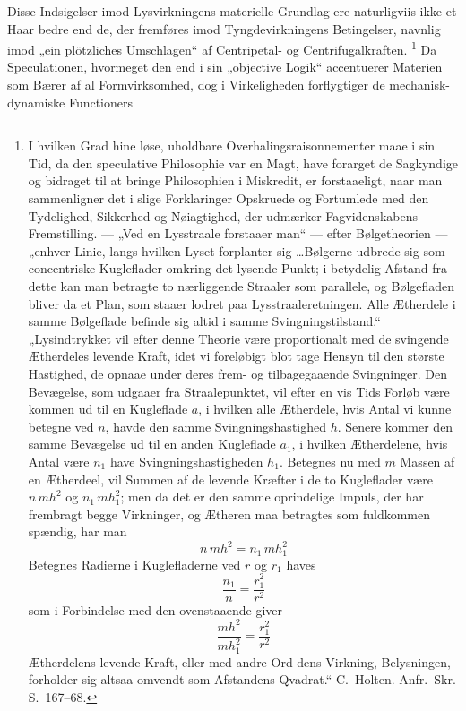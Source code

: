 \documentclass[12pt]{book}
\newcommand{\opage}[1]{\marginnote{\footnotesize\textit{[#1]}}}
\begin{document}
Disse Indsigelser imod Lysvirkningens materielle Grundlag ere naturligviis ikke et Haar
bedre end de, der fremføres imod Tyngdevirkningens Betingelser, navnlig imod „ein plötzliches
Umschlagen“ af Centripetal- og Centrifugalkraften.%
\footnote{I hvilken Grad hine løse, uholdbare Overhalingsraisonnementer maae i sin Tid, da den
  speculative Philosophie var en Magt, have forarget de Sagkyndige og bidraget til at bringe
  Philosophien i Miskredit, er forstaaeligt, naar man sammenligner det i slige Forklaringer
  Opskruede og Fortumlede med den Tydelighed, Sikkerhed og Nøiagtighed, der udmærker
  Fagvidenskabens Fremstilling. --- „Ved en Lysstraale forstaaer man“ --- efter Bølgetheorien
  --- „enhver Linie, langs hvilken Lyset forplanter sig \ldots Bølgerne udbrede sig som
  concentriske Kugleflader omkring det lysende Punkt; i betydelig Afstand fra dette kan man
  betragte to nærliggende Straaler som parallele, og Bølgefladen bliver da et Plan, som staaer
  lodret paa Lysstraaleretningen. Alle Ætherdele i samme Bølgeflade befinde sig altid i samme
  Svingningstilstand.“ „Lysindtrykket vil efter denne Theorie være proportionalt med de
  svingende Ætherdeles levende Kraft, idet vi foreløbigt blot tage Hensyn til den største
  Hastighed, de opnaae under deres frem- og tilbagegaaende Svingninger. Den Bevægelse, som
  udgaaer fra Straalepunktet, vil efter en vis Tids Forløb være kommen ud til en Kugleflade
  $a$, i hvilken alle Ætherdele, hvis Antal vi kunne betegne ved $n$, havde den samme
  Svingningshastighed $h$. Senere kommer den samme Bevægelse ud til en anden Kugleflade $a_{1}$,
  i hvilken Ætherdelene, hvis Antal være $n_{1}$ have Svingningshastigheden $h_{1}$. Betegnes
  nu med $m$ Massen af en Ætherdeel, vil Summen af de levende Kræfter i de to Kugleflader være
  $n\,mh^{2}$ og $n_{1}\,mh_{1}^{2}$; men da det er den samme oprindelige Impuls, der har
  frembragt begge Virkninger, og Ætheren maa betragtes som fuldkommen spændig, har man
  \[ n\,mh^{2} = n_{1}\,mh_{1}^{2} \]
  Betegnes Radierne i Kuglefladerne ved $r$ og $r_{1}$ haves
  \[ \frac{n_{1}}{n} = \frac{r_{1}^{2}}{r^{2}} \]
  som i Forbindelse med den ovenstaaende giver
  \[ \frac{mh^{2}}{mh_{1}^{2}} = \frac{r_{1}^{2}}{r^{2}} \]
  Ætherdelens levende Kraft, eller med andre Ord dens Virkning, Belysningen, forholder sig
  altsaa omvendt som Afstandens Qvadrat.“ C.\ Holten. Anfr.\ Skr. S.~167--68.}
\opage{380} Da Speculationen, hvormeget den end i sin „objective Logik“ accentuerer Materien som Bærer af
al Formvirksomhed, dog i Virkeligheden forflygtiger de mechanisk-dynamiske Functioners
\end{document}
